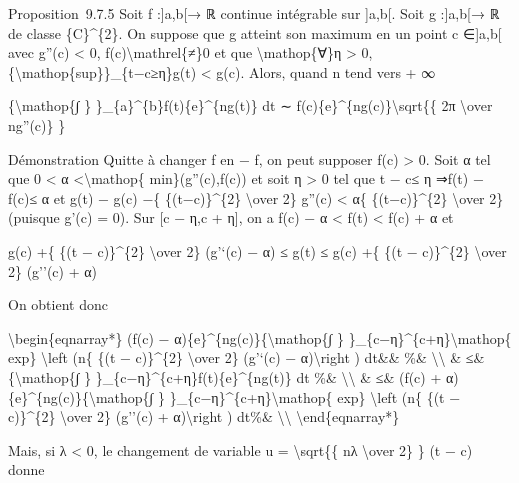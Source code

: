 \documentclass[]{article}
\begin{document}
Proposition~9.7.5 Soit f :{]}a,b{[}→ ℝ continue intégrable sur
{]}a,b{[}. Soit g :{]}a,b{[}→ ℝ de classe \{C\}\^{}\{2\}. On suppose que
g atteint son maximum en un point c ∈{]}a,b{[} avec g''(c) \textless{}
0, f(c)\textbackslash{}mathrel\{≠\}0 et que \textbackslash{}mathop\{∀\}η
\textgreater{} 0,
\{\textbackslash{}mathop\{sup\}\}\_\{\textbar{}t−c\textbar{}≥η\}g(t)
\textless{} g(c). Alors, quand n tend vers + ∞

\{\textbackslash{}mathop\{∫ \} \}\_\{a\}\^{}\{b\}f(t)\{e\}\^{}\{ng(t)\}
dt ∼ f(c)\{e\}\^{}\{ng(c)\}\textbackslash{}sqrt\{\{ 2π
\textbackslash{}over n\textbar{}g''(c)\textbar{}\} \}

Démonstration Quitte à changer f en − f, on peut supposer f(c)
\textgreater{} 0. Soit α tel que 0 \textless{} α
\textless{}\textbackslash{}mathop\{
min\}(\textbar{}g''(c)\textbar{},f(c)) et soit η \textgreater{} 0 tel
que \textbar{}t − c\textbar{}≤ η ⇒\textbar{}f(t) − f(c)\textbar{}≤ α et
\textbar{}g(t) − g(c) −\{ \{(t−c)\}\^{}\{2\} \textbackslash{}over 2\}
g''(c)\textbar{} \textless{} α\{ \{(t−c)\}\^{}\{2\} \textbackslash{}over
2\} (puisque g'(c) = 0). Sur {[}c − η,c + η{]}, on a f(c) − α
\textless{} f(t) \textless{} f(c) + α et

g(c) +\{ \{(t − c)\}\^{}\{2\} \textbackslash{}over 2\} (g'`(c) − α) ≤
g(t) ≤ g(c) +\{ \{(t − c)\}\^{}\{2\} \textbackslash{}over 2\} (g''(c) +
α)

On obtient donc

\textbackslash{}begin\{eqnarray*\} (f(c) −
α)\{e\}\^{}\{ng(c)\}\{\textbackslash{}mathop\{∫ \}
\}\_\{c−η\}\^{}\{c+η\}\textbackslash{}mathop\{ exp\}
\textbackslash{}left (n\{ \{(t − c)\}\^{}\{2\} \textbackslash{}over 2\}
(g'`(c) − α)\textbackslash{}right ) dt\&\& \%\&
\textbackslash{}\textbackslash{} \& ≤\& \{\textbackslash{}mathop\{∫ \}
\}\_\{c−η\}\^{}\{c+η\}f(t)\{e\}\^{}\{ng(t)\} dt \%\&
\textbackslash{}\textbackslash{} \& ≤\& (f(c) +
α)\{e\}\^{}\{ng(c)\}\{\textbackslash{}mathop\{∫ \}
\}\_\{c−η\}\^{}\{c+η\}\textbackslash{}mathop\{ exp\}
\textbackslash{}left (n\{ \{(t − c)\}\^{}\{2\} \textbackslash{}over 2\}
(g''(c) + α)\textbackslash{}right ) dt\%\&
\textbackslash{}\textbackslash{} \textbackslash{}end\{eqnarray*\}

Mais, si λ \textless{} 0, le changement de variable u =
\textbackslash{}sqrt\{\{ n\textbar{}λ\textbar{} \textbackslash{}over 2\}
\} (t − c) donne
\end{document}
